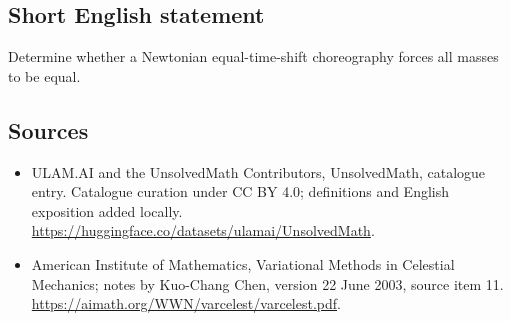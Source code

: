 \documentclass[11pt]{article}
\begin{document}
\subsection{Short English statement}
Determine whether a Newtonian equal-time-shift choreography forces all masses to be equal.
\subsection{Sources}
\begin{itemize}
\item[\hypertarget{source:statement:1}{S1}] ULAM.AI and the UnsolvedMath Contributors, UnsolvedMath, catalogue entry. Catalogue curation under CC BY 4.0; definitions and English exposition added locally.
\url{https://huggingface.co/datasets/ulamai/UnsolvedMath}.
\item[\hypertarget{source:statement:2}{S2}] American Institute of Mathematics, Variational Methods in Celestial Mechanics; notes by Kuo-Chang Chen, version 22 June 2003, source item 11.
\url{https://aimath.org/WWN/varcelest/varcelest.pdf}.
\end{itemize}
\label{end:statement}
\end{document}
